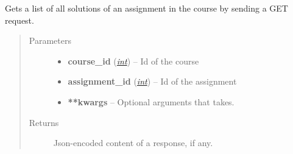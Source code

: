 \documentclass[letterpaper,10pt,english]{sphinxmanual}
\begin{document}
\begin{fulllineitems}
\label{web_portal:core.courses.api.get_solutions}
Gets a list of all solutions of an assignment in the course by sending a
GET request.
\begin{quote}\begin{description}
\item[{Parameters}] \leavevmode\begin{itemize}
\item {} 
\textbf{course\_id} (\href{http://docs.python.org/library/functions.html\#int}{\emph{int}}) -- Id of the course

\item {} 
\textbf{assignment\_id} (\href{http://docs.python.org/library/functions.html\#int}{\emph{int}}) -- Id of the assignment

\item {} 
\textbf{**kwargs} -- Optional arguments that  takes.

\end{itemize}

\item[{Returns}] \leavevmode
Json-encoded content of a response, if any.

\end{description}\end{quote}

\end{fulllineitems}

\end{document}
